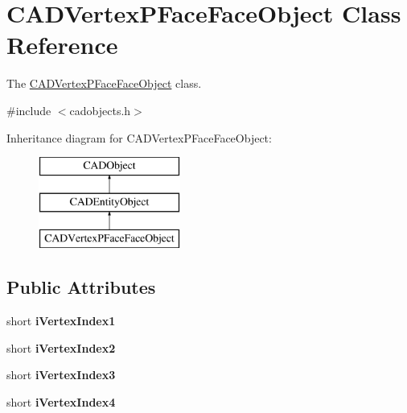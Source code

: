 \hypertarget{class_c_a_d_vertex_p_face_face_object}{}\section{C\+A\+D\+Vertex\+P\+Face\+Face\+Object Class Reference}
\label{class_c_a_d_vertex_p_face_face_object}


The \hyperlink{class_c_a_d_vertex_p_face_face_object}{C\+A\+D\+Vertex\+P\+Face\+Face\+Object} class.  




{\ttfamily \#include $<$cadobjects.\+h$>$}

Inheritance diagram for C\+A\+D\+Vertex\+P\+Face\+Face\+Object\+:\begin{figure}[H]
\begin{center}
\leavevmode
\includegraphics[height=3.000000cm]{class_c_a_d_vertex_p_face_face_object}
\end{center}
\end{figure}
\subsection*{Public Attributes}
\begin{DoxyCompactItemize}
\item 
short {\bfseries i\+Vertex\+Index1}\hypertarget{class_c_a_d_vertex_p_face_face_object_a29412ef8c4aff43352be4d0334499b7a}{}\label{class_c_a_d_vertex_p_face_face_object_a29412ef8c4aff43352be4d0334499b7a}

\item 
short {\bfseries i\+Vertex\+Index2}\hypertarget{class_c_a_d_vertex_p_face_face_object_ab89dfafc84a99d5046947121f96c10be}{}\label{class_c_a_d_vertex_p_face_face_object_ab89dfafc84a99d5046947121f96c10be}

\item 
short {\bfseries i\+Vertex\+Index3}\hypertarget{class_c_a_d_vertex_p_face_face_object_ab19aa0b3dac60976755a0d7ed0d3719f}{}\label{class_c_a_d_vertex_p_face_face_object_ab19aa0b3dac60976755a0d7ed0d3719f}

\item 
short {\bfseries i\+Vertex\+Index4}\hypertarget{class_c_a_d_vertex_p_face_face_object_abaeb791c0b343096c877d0dabd51967c}{}\label{class_c_a_d_vertex_p_face_face_object_abaeb791c0b343096c877d0dabd51967c}

\end{DoxyCompactItemize}
